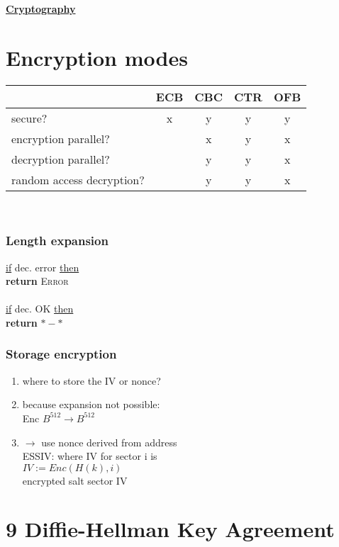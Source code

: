 \documentclass{report}
\begin{document}
\begin{center}
\huge{\textbf{\underline{Cryptography}}}
\end{center}

	{\let\clearpage\relax \chapter*{Encryption modes}}
	\begin{tabular}{|l|c|c|c|c|}
		\hline
		& ECB & CBC & CTR & OFB \\
		\hline
		secure? & x & y & y & y \\
		encryption parallel? & & x & y & x \\
		decryption parallel? & & y & y & x\\
		random access decryption? & & y & y & x \\
		\hline
	\end{tabular} \\
	\subsection*{Length expansion}
	\underline{if} dec. error \underline{then} \\
	\textbf{return} \textsc{Error} \\ \\
	\underline{if} dec. OK \underline{then} \\
	\textbf{return} $*-*$
	\subsection*{Storage encryption}
	\begin{enumerate}[-]
		\item where to store the IV or nonce?
		\item because expansion not possible:\\
		Enc $B^{512} \rightarrow B^{512}$
		\item $\rightarrow$ use nonce derived from address \\
		ESSIV: where IV for sector i is \\
		$IV := Enc(H(k),i)$ \\
		encrypted salt sector IV
	\end{enumerate}
	{\let\clearpage\relax \chapter*{9 Diffie-Hellman Key Agreement}}
\end{document}
